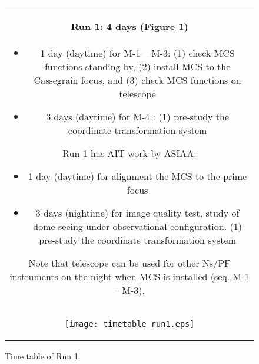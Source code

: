 \begin{figure}[!ht]
\begin{center}
\begin{tabular}{c}
\begin{minipage}{0.95\hsize}
\paragraph{Run 1: 4 days (Figure \ref{fig:run1})}
	\begin{itemize}
 	\item 1 day (daytime) for M-1 --  M-3: 
	(1) check MCS functions standing by,
	(2) install MCS to the Cassegrain focus, and
	(3) check MCS functions on telescope
 	\item 3 days (daytime) for M-4 : 
	(1) pre-study the coordinate transformation system
	\end{itemize}
Run 1 has AIT work by ASIAA:
	\begin{itemize}
 	\item 1 day (daytime) for alignment the MCS to the prime focus
 	\item 3 days (nightime) for image quality test, study of dome seeing under observational configuration.
	(1) pre-study the coordinate transformation system
	\end{itemize}
Note that telescope can be used for other Ns/PF instruments on the night when MCS is installed (seq. M-1 -- M-3).
\end{minipage} \\
\begin{minipage}{0.8\hsize}
	\begin{center}
	\vspace*{5mm}
	\texttt{[image: timetable\_run1.eps]}
	\end{center}
	\vspace*{-5mm}
	\caption{Time table of Run 1.}
	\label{fig:run1}
\end{minipage}
\end{tabular}
\end{center}
\end{figure}

